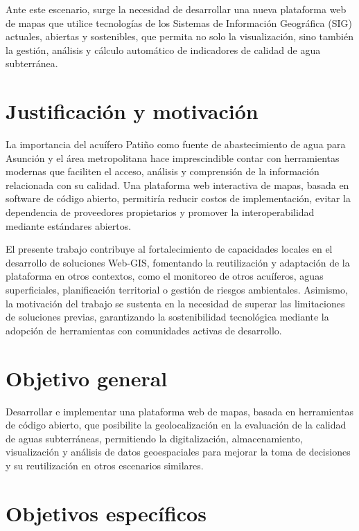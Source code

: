 \documentclass[12pt,a4paper]{report}
\begin{document}
Ante este escenario, surge la necesidad de desarrollar una nueva plataforma web de mapas que utilice tecnologías de los Sistemas de Información Geográfica (SIG) actuales, abiertas y sostenibles, que permita no solo la visualización, sino también la gestión, análisis y cálculo automático de indicadores de calidad de agua subterránea.

\section{Justificación y motivación}

La importancia del acuífero Patiño como fuente de abastecimiento de agua para Asunción y el área metropolitana hace imprescindible contar con herramientas modernas que faciliten el acceso, análisis y comprensión de la información relacionada con su calidad. Una plataforma web interactiva de mapas, basada en software de código abierto, permitiría reducir costos de implementación, evitar la dependencia de proveedores propietarios y promover la interoperabilidad mediante estándares abiertos.

El presente trabajo contribuye al fortalecimiento de capacidades locales en el desarrollo de soluciones Web-GIS, fomentando la reutilización y adaptación de la plataforma en otros contextos, como el monitoreo de otros acuíferos, aguas superficiales, planificación territorial o gestión de riesgos ambientales. Asimismo, la motivación del trabajo se sustenta en la necesidad de superar las limitaciones de soluciones previas, garantizando la sostenibilidad tecnológica mediante la adopción de herramientas con comunidades activas de desarrollo.

\section{Objetivo general}

Desarrollar e implementar una plataforma web de mapas, basada en herramientas de código abierto, que posibilite la geolocalización en la evaluación de la calidad de aguas subterráneas, permitiendo la digitalización, almacenamiento, visualización y análisis de datos geoespaciales para mejorar la toma de decisiones y su reutilización en otros escenarios similares.

\section{Objetivos específicos}
\end{document}
